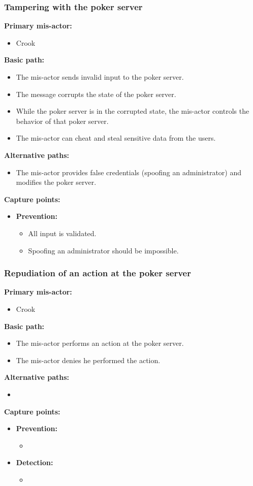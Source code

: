 \documentclass[a4paper,11pt]{report}
\begin{document}
\subsubsection{Tampering with the poker server}
\textbf{Primary mis-actor:}
\begin{itemize}
\item Crook
\end{itemize}
\textbf{Basic path:}
\begin{itemize}
\item The mis-actor sends invalid input to the poker server.
\item The message corrupts the state of the poker server. 
\item While the poker server is in the corrupted state, the mis-actor controls the behavior of that poker server.
\item The mis-actor can cheat and steal sensitive data from the users.
\end{itemize}
\textbf{Alternative paths:}
\begin{itemize}
\item The mis-actor provides false credentials (spoofing an administrator) and modifies the poker server.
\end{itemize}
\textbf{Capture points:}
\begin{itemize}
\item \textbf{Prevention:}
\begin{itemize}
\item All input is validated.
\item Spoofing an administrator should be impossible.
\end{itemize}
\end{itemize}

\subsubsection{Repudiation of an action at the poker server}
\textbf{Primary mis-actor:}
\begin{itemize}
\item Crook
\end{itemize}
\textbf{Basic path:}
\begin{itemize}
\item The mis-actor performs an action at the poker server.
\item The mis-actor denies he performed the action.
\end{itemize}
\textbf{Alternative paths:}
\begin{itemize}
\item 
\end{itemize}
\textbf{Capture points:}
\begin{itemize}
\item \textbf{Prevention:}
\begin{itemize}
\item 
\end{itemize}
\item \textbf{Detection:}
\begin{itemize}
\item 
\end{itemize}
\end{itemize}
\end{document}
